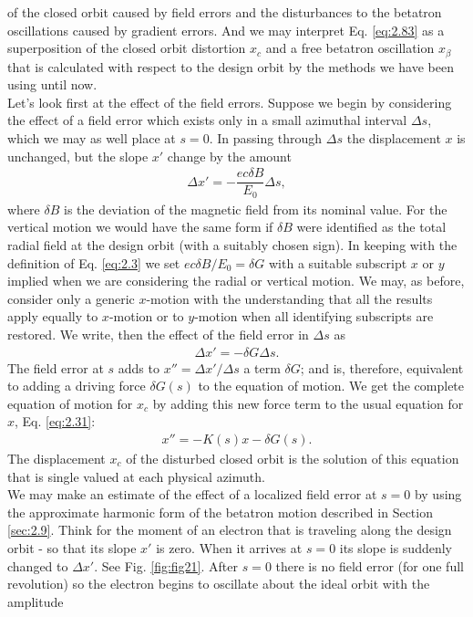  of the closed orbit caused by field errors and the disturbances to the betatron oscillations
 caused by gradient errors. And we may interpret Eq. \eqref{eq:2.83} as a superposition of the closed orbit distortion $x_c$ and a free betatron oscillation $x_\beta$ that is calculated with respect to the design orbit by the methods we have been using until now.\\
Let’s look first at the effect of the field errors. Suppose we begin by considering the effect of a field error which exists only in a small azimuthal interval $\Delta s$, which we may as well place at $s = 0$. In passing through $\Delta s$ the displacement $x$ is unchanged, but the slope $x'$ change by the amount
\begin{align*}
	\Delta x' = - \dfrac{ec\delta B}{E_0}\Delta s,
\end{align*}
where $\delta B$ is the deviation of the magnetic field from its nominal value. For the vertical
 motion we would have the same form if $\delta B$ were identified as the total radial field at the design orbit (with a suitably chosen sign). In keeping with the definition of Eq. \eqref{eq:2.3} we set $ec \delta B/E_0 = \delta G$ with a suitable subscript $x$ or $y$ implied when we are considering the radial or vertical motion. We may, as before, consider only a generic $x$-motion with the understanding that all the results apply equally to $x$-motion
 or to $y$-motion when all identifying subscripts are restored. We write, then the effect of the field error in $\Delta s$ as
\begin{align}\label{eq:2.84}
	\Delta x' = -\delta G \Delta s.
\end{align}
The field error at $s$ adds to $x'' = \Delta x'/\Delta s$ a term $\delta G$; and is, therefore, equivalent to adding a driving force $\delta G(s)$ to the equation of motion. We get the complete
equation of motion for $x_c$ by adding this new force term to the usual equation for $x$, Eq. \eqref{eq:2.31}:
\begin{align}\label{eq:2.85}
	x'' = -K(s)x -\delta G(s).
\end{align}
The displacement $x_c$ of the disturbed closed orbit is the solution of this equation
that is single valued at each physical azimuth.\\
We may make an estimate of the effect of a localized field error at $s = 0$ by using the approximate harmonic form of the betatron motion described in Section \ref{sec:2.9}. Think for the moment of an electron that is traveling along the design orbit - so that its slope $x'$ is zero. When it arrives at $s = 0$ its slope is suddenly changed to $\Delta x'$. See Fig. \ref{fig:fig21}. After $s = 0$ there is no field error (for one full revolution) so the electron begins to oscillate about the ideal orbit with the amplitude
